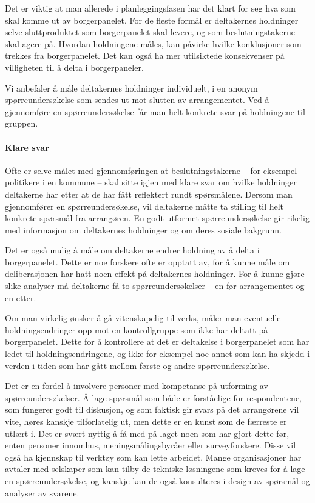 \documentclass[
  12pt,
  a4paper, 12pt]{article}
\begin{document}
Det er viktig at man allerede i planleggingsfasen har det klart for seg hva som skal komme ut av borgerpanelet. For de fleste formål er deltakernes holdninger selve sluttproduktet som borgerpanelet skal levere, og som beslutningstakerne skal agere på. Hvordan holdningene måles, kan påvirke hvilke konklusjoner som trekkes fra borgerpanelet. Det kan også ha mer utilsiktede konsekvenser på villigheten til å delta i borgerpaneler.

Vi anbefaler å måle deltakernes holdninger individuelt, i en anonym spørreundersøkelse som sendes ut mot slutten av arrangementet. Ved å gjennomføre en spørreundersøkelse får man helt konkrete svar på holdningene til gruppen.

\hypertarget{klare-svar}{%
\paragraph{Klare svar}\label{klare-svar}}

Ofte er selve målet med gjennomføringen at beslutningstakerne -- for eksempel politikere i en kommune -- skal sitte igjen med klare svar om hvilke holdninger deltakerne har etter at de har fått reflektert rundt spørsmålene. Dersom man gjennomfører en spørreundersøkelse, vil deltakerne måtte ta stilling til helt konkrete spørsmål fra arrangøren. En godt utformet spørreundersøkelse gir rikelig med informasjon om deltakernes holdninger og om deres sosiale bakgrunn.

Det er også mulig å måle om deltakerne endrer holdning av å delta i borgerpanelet. Dette er noe forskere ofte er opptatt av, for å kunne måle om deliberasjonen har hatt noen effekt på deltakernes holdninger. For å kunne gjøre slike analyser må deltakerne få to spørreundersøkelser -- en før arrangementet og en etter.

Om man virkelig ønsker å gå vitenskapelig til verks, måler man eventuelle holdningsendringer opp mot en kontrollgruppe som ikke har deltatt på borgerpanelet. Dette for å kontrollere at det er deltakelse i borgerpanelet som har ledet til holdningsendringene, og ikke for eksempel noe annet som kan ha skjedd i verden i tiden som har gått mellom første og andre spørreundersøkelse.

Det er en fordel å involvere personer med kompetanse på utforming av spørreundersøkelser. Å lage spørsmål som både er forståelige for respondentene, som fungerer godt til diskusjon, og som faktisk gir svars på det arrangørene vil vite, høres kanskje tilforlatelig ut, men dette er en kunst som de færreste er utlært i. Det er svært nyttig å få med på laget noen som har gjort dette før, enten personer innomhus, meningsmålingsbyråer eller surveyforskere. Disse vil også ha kjennskap til verktøy som kan lette arbeidet. Mange organisasjoner har avtaler med selskaper som kan tilby de tekniske løsningene som kreves for å lage en spørreundersøkelse, og kanskje kan de også konsulteres i design av spørsmål og analyser av svarene.
\end{document}
